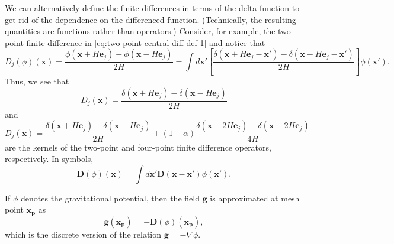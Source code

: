 We can alternatively define the finite differences in terms of the delta function to get rid of the dependence on the differenced function. (Technically, the resulting quantities are functions rather than operators.)
Consider, for example, the two-point finite difference in \autoref{eq:two-point-central-diff-def-1} and notice that
\begin{equation*}
    D_j(\phi)(\mathbf{x}) = \frac{\phi(\mathbf{x} + H \mathbf{e}_j)-\phi (\mathbf{x} - H \mathbf{e}_j)}{2H} = \int d\mathbf{x}' \left[ \frac{\delta(\mathbf{x} + H\mathbf{e}_j - \mathbf{x}') - \delta(\mathbf{x} - H\mathbf{e}_j - \mathbf{x}')}{2H} \right]\phi(\mathbf{x}').
\end{equation*}
Thus, we see that
\begin{equation}\label{eq:two-point-central-diff}
    D_j(\mathbf{x}) = \frac{\delta(\mathbf{x} + H\mathbf{e}_j) - \delta(\mathbf{x} - H\mathbf{e}_j)}{2H}
\end{equation}
and
\begin{equation}\label{eq:four-point-central-diff}
    D_j(\mathbf{x}) = \frac{\delta(\mathbf{x} + H\mathbf{e}_j) - \delta(\mathbf{x} - H\mathbf{e}_j)}{2H} + (1-\alpha)\frac{\delta(\mathbf{x} + 2H\mathbf{e}_j) - \delta(\mathbf{x} - 2H\mathbf{e}_j)}{4H}
\end{equation}
are the kernels of the two-point and four-point finite difference operators, respectively.
In symbols,
\begin{equation*}
    \mathbf{D}(\phi)(\mathbf{x}) = \int d\mathbf{x}' \mathbf{D}(\mathbf{x} - \mathbf{x}')\phi(\mathbf{x}').
\end{equation*}

If $\phi$ denotes the gravitational potential, then the field $\mathbf{g}$ is approximated at mesh point $\mathbf{x}_\mathbf{p}$ as
\begin{equation*}
    \mathbf{g}(\mathbf{x}_\mathbf{p}) = -\mathbf{D}(\phi)(\mathbf{x}_\mathbf{p}),
\end{equation*}
which is the discrete version of the relation $\mathbf{g} = -\nabla \phi$.
